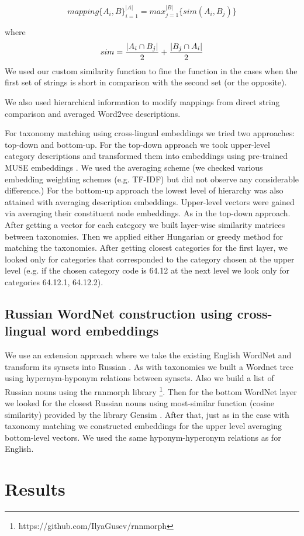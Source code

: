\documentclass[11pt,a4paper]{article}
\begin{document}
$$mapping\{A_i, B\}_{i=1}^{|A|} = max_{j=1}^{|B|}\{sim(A_i,B_j)\}$$

where $$sim = \dfrac{|A_i \cap B_j|}{2} + \\ \dfrac{|B_j \cap A_i|}{2} $$
We used our custom similarity function to fine the function in the cases when the first set of strings is short in comparison with the second set (or the opposite).

We also used hierarchical information to modify mappings from direct string comparison and averaged Word2vec descriptions.  

For taxonomy matching using cross-lingual embeddings we tried two approaches: top-down and bottom-up. For the top-down approach we took upper-level category descriptions and transformed them into embeddings using pre-trained MUSE embeddings \cite{muse}. We used the averaging scheme (we checked various embedding weighting schemes (e.g. TF-IDF) but did not observe any considerable difference.)
For the bottom-up approach the lowest level of hierarchy was also attained with averaging description embeddings. Upper-level vectors were gained via averaging their constituent node embeddings. As in the top-down approach.
After getting a vector for each category we built layer-wise similarity matrices between taxonomies. Then we applied either Hungarian or greedy method for matching the taxonomies. After getting closest categories for the first layer, we looked only for categories that corresponded to the category chosen at the upper level (e.g. if the chosen category code is 64.12 at the next level we look only for categories 64.12.1, 64.12.2).
\subsection{Russian WordNet construction using cross-lingual word embeddings}
We use an extension approach where we take the existing English WordNet and transform its synsets into Russian \cite{NEALE18.1030}. As with taxonomies we built a Wordnet tree using hypernym-hyponym relations between synsets. Also we build a list of Russian nouns using the rnnmorph library \footnote{https://github.com/IlyaGusev/rnnmorph}. Then for the bottom WordNet layer we looked for the closest Russian nouns using most-similar function (cosine similarity) provided by the library Gensim \cite{gensim}. After that, just as in the case with taxonomy matching we constructed embeddings for the upper level averaging bottom-level vectors. We used the same hyponym-hyperonym relations as for English.
\section{Results}
\end{document}
